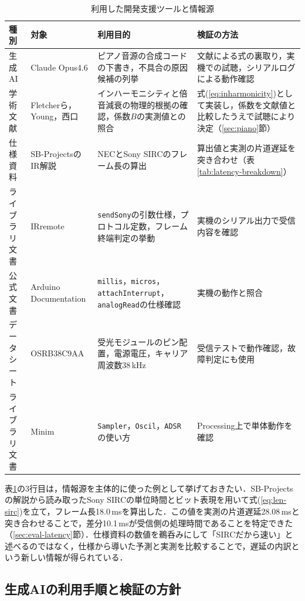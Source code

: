 \documentclass[uplatex,dvipdfmx]{jlreq}
\begin{document}
\begin{table}[tb]
\caption{利用した開発支援ツールと情報源}
\label{tab:tools}
\begin{center}
\footnotesize
\begin{tabular}{lp{9em}p{10em}p{10em}}
\hline
種別 & 対象 & 利用目的 & 検証の方法 \\
\hline
生成AI & Claude Opus4.6 & ピアノ音源の合成コードの下書き，不具合の原因候補の列挙 & 文献による式の裏取り，実機での試聴，シリアルログによる動作確認 \\
学術文献 & Fletcherら\cite{fletcher}，Young\cite{young1952}，西口\cite{nishiguchi} & インハーモニシティと倍音減衰の物理的根拠の確認，係数$B$の実測値との照合 & 式(\ref{eq:inharmonicity})として実装し，係数を文献値と比較したうえで試聴により決定（\ref{sec:piano}節） \\
仕様資料 & SB-ProjectsのIR解説\cite{necfmt,sircfmt} & NECとSony SIRCのフレーム長の算出 & 算出値と実測の片道遅延を突き合わせ（表\ref{tab:latency-breakdown}） \\
ライブラリ文書 & IRremote\cite{irremote} & \texttt{sendSony}の引数仕様，プロトコル定数，フレーム終端判定の挙動 & 実機のシリアル出力で受信内容を確認 \\
公式文書 & Arduino Documentation\cite{arduinodoc} & \texttt{millis}，\texttt{micros}，\texttt{attachInterrupt}，\texttt{analogRead}の仕様確認 & 実機の動作と照合 \\
データシート & OSRB38C9AA\cite{osrb} & 受光モジュールのピン配置，電源電圧，キャリア周波数38\,kHz & 受信テストで動作確認，故障判定にも使用 \\
ライブラリ文書 & Minim\cite{minim} & \texttt{Sampler}，\texttt{Oscil}，\texttt{ADSR}の使い方 & Processing上で単体動作を確認 \\
\hline
\end{tabular}
\end{center}
\end{table}

表\ref{tab:tools}の3行目は，情報源を主体的に使った例として挙げておきたい．SB-Projectsの解説から読み取ったSony SIRCの単位時間とビット表現を用いて式(\ref{eq:len-sirc})を立て，フレーム長18.0\,msを算出した．この値を実測の片道遅延28.08\,msと突き合わせることで，差分10.1\,msが受信側の処理時間であることを特定できた（\ref{sec:eval-latency}節）．仕様資料の数値を鵜呑みにして「SIRCだから速い」と述べるのではなく，仕様から導いた予測と実測を比較することで，遅延の内訳という新しい情報が得られている．

\subsection{生成AIの利用手順と検証の方針}
\end{document}
